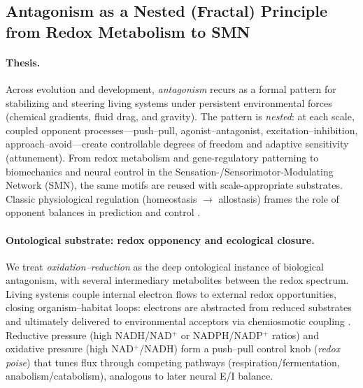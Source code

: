 \subsection{Antagonism as a Nested (Fractal) Principle from Redox Metabolism to SMN}
\label{subsec:antagonism_nested}

\paragraph{Thesis.}
Across evolution and development, \emph{antagonism} recurs as a formal pattern for stabilizing and steering living systems under persistent environmental forces (chemical gradients, fluid drag, and gravity). The pattern is \emph{nested}: at each scale, coupled opponent processes---push--pull, agonist--antagonist, excitation--inhibition, approach--avoid---create controllable degrees of freedom and adaptive sensitivity (attunement). From redox metabolism and gene-regulatory patterning to biomechanics and neural control in the Sensation-/Sensorimotor-Modulating Network (SMN), the same motifs are reused with scale-appropriate substrates. Classic physiological regulation (homeostasis $\to$ allostasis) frames the role of opponent balances in prediction and control \citep{Cannon1932_WisdomBody,Sterling2012_Allostasis}.

\paragraph{Ontological substrate: redox opponency and ecological closure.}
We treat \emph{oxidation--reduction} as the deep ontological instance of biological antagonism, with several intermediary metabolites between the redox spectrum. Living systems couple internal electron flows to external redox opportunities, closing organism--habitat loops: electrons are abstracted from reduced substrates and ultimately delivered to environmental acceptors via chemiosmotic coupling \citep{GN2005_TowardsModelLifeCognition,Mitchell1961_Chemiosmotic,NichollsFerguson2013_Bioenergetics}. Reductive pressure (high NADH/NAD$^+$ or NADPH/NADP$^+$ ratios) and oxidative pressure (high NAD$^+$/NADH) form a push--pull control knob (\emph{redox poise}) that tunes flux through competing pathways (respiration/fermentation, anabolism/catabolism), analogous to later neural E/I balance.

